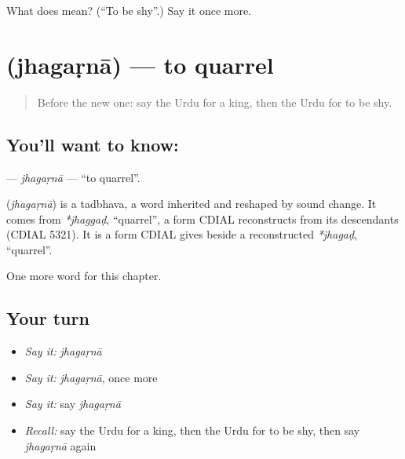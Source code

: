 \begin{tcolorbox}[breakable,colback=teal!4,colframe=teal!35!black,title={Before you move on}]
What does  mean? (\textquotedblleft{}To be shy\textquotedblright{}.) Say it once more.
\end{tcolorbox}
\section[\texorpdfstring{\ur{جھگڑنا} (jhagaṛnā)}{جھگڑنا (jhagaṛnā)}]{ (jhagaṛnā) — to quarrel}

\label{lesson:UR-C180-jhagarna}



\begin{quote}
Before the new one: say the Urdu for a king, then the Urdu for to be shy.
\end{quote}

\subsection*{You'll want to know: }
\textbf{} — \emph{jhagaṛnā} — \textquotedblleft{}to quarrel\textquotedblright{}.

\begin{cousinweb}
\textbf{} (\emph{jhagaṛnā}) is a tadbhava, a word inherited and reshaped by sound change. It comes from \emph{*jhaggaḍ}, \textquotedblleft{}quarrel\textquotedblright{}, a form CDIAL reconstructs from its descendants (CDIAL 5321). It is a form CDIAL gives beside a reconstructed \emph{*jhagaḍ}, \textquotedblleft{}quarrel\textquotedblright{}.
\end{cousinweb}

\begin{grammarlens}[title={What you've built}]
One more word for this chapter.
\end{grammarlens}

\subsection*{Your turn}
\begin{itemize}
\raggedright
  \item \emph{Say it:} \emph{jhagaṛnā}
  \item \emph{Say it:} \emph{jhagaṛnā}, once more
  \item \emph{Say it:} say \emph{jhagaṛnā}
  \item \emph{Recall:} say the Urdu for a king, then the Urdu for to be shy, then say \emph{jhagaṛnā} again
\end{itemize}


